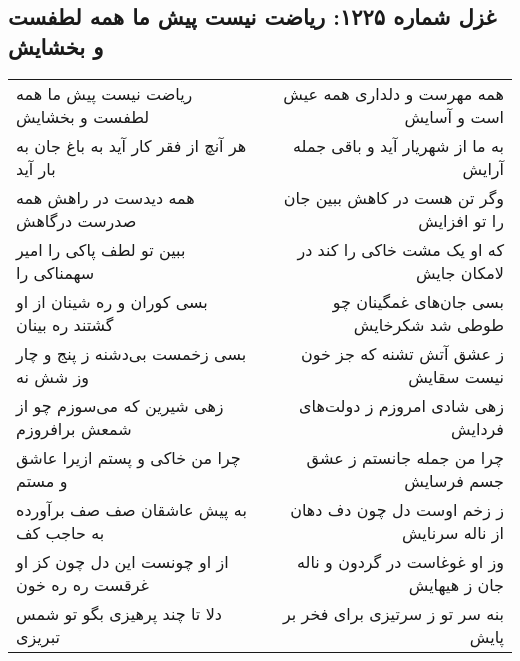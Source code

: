 \begin{center}
\section*{غزل شماره ۱۲۲۵: ریاضت نیست پیش ما همه لطفست و بخشایش}
\label{sec:1225}
\begin{longtable}{l p{0.5cm} r}
ریاضت نیست پیش ما همه لطفست و بخشایش
&&
همه مهرست و دلداری همه عیش است و آسایش
\\
هر آنچ از فقر کار آید به باغ جان به بار آید
&&
به ما از شهریار آید و باقی جمله آرایش
\\
همه دیدست در راهش همه صدرست درگاهش
&&
وگر تن هست در کاهش ببین جان را تو افزایش
\\
ببین تو لطف پاکی را امیر سهمناکی را
&&
که او یک مشت خاکی را کند در لامکان جایش
\\
بسی کوران و ره شینان از او گشتند ره بینان
&&
بسی جان‌های غمگینان چو طوطی شد شکرخایش
\\
بسی زخمست بی‌دشنه ز پنج و چار وز شش نه
&&
ز عشق آتش تشنه که جز خون نیست سقایش
\\
زهی شیرین که می‌سوزم چو از شمعش برافروزم
&&
زهی شادی امروزم ز دولت‌های فردایش
\\
چرا من خاکی و پستم ازیرا عاشق و مستم
&&
چرا من جمله جانستم ز عشق جسم فرسایش
\\
به پیش عاشقان صف صف برآورده به حاجب کف
&&
ز زخم اوست دل چون دف دهان از ناله سرنایش
\\
از او چونست این دل چون کز او غرقست ره ره خون
&&
وز او غوغاست در گردون و ناله جان ز هیهایش
\\
دلا تا چند پرهیزی بگو تو شمس تبریزی
&&
بنه سر تو ز سرتیزی برای فخر بر پایش
\\
\end{longtable}
\end{center}
